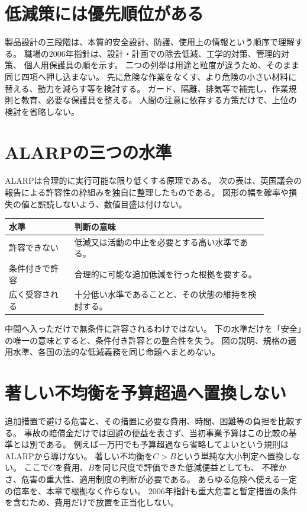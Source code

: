 \section{低減策には優先順位がある}
\label{theory:safety:hierarchy}
製品設計の三段階は、本質的安全設計、防護、使用上の情報という順序で理解する。
職場の2006年指針は、設計・計画での除去低減、工学的対策、管理的対策、
個人用保護具の順を示す\cite{saf_ra2006}。
二つの列挙は用途と粒度が違うため、そのまま同じ四項へ押し込まない。
先に危険な作業をなくす、より危険の小さい材料に替える、動力を減らす等を検討する。
ガード、隔離、排気等で補完し、作業規則と教育、必要な保護具を整える。
人間の注意に依存する方策だけで、上位の検討を省略しない。

\section{ALARPの三つの水準}
\label{theory:safety:alarp}
ALARPは合理的に実行可能な限り低くする原理である。
次の表は、英国議会の報告による許容性の枠組みを独自に整理したものである\cite{saf_parliament2006}。
図形の幅を確率や損失の値と誤読しないよう、数値目盛は付けない。
\begin{center}
\begin{tabular}{p{0.22\linewidth}p{0.65\linewidth}}
\hline
水準 & 判断の意味\\
\hline
許容できない & 低減又は活動の中止を必要とする高い水準である。\\
条件付きで許容 & 合理的に可能な追加低減を行った根拠を要する。\\
広く受容される & 十分低い水準であることと、その状態の維持を検討する。\\
\hline
\end{tabular}
\end{center}
中間へ入っただけで無条件に許容されるわけではない。
下の水準だけを「安全」の唯一の意味とすると、条件付き許容との整合性を失う。
図の説明、規格の適用水準、各国の法的な低減義務を同じ命題へまとめない。

\section{著しい不均衡を予算超過へ置換しない}
追加措置で避ける危害と、その措置に必要な費用、時間、困難等の負担を比較する。
事故の賠償金だけでは回避の便益を表さず、当初事業予算はこの比較の基準とは別である。
例えば一万円でも予算超過なら省略してよいという規則はALARPから導けない。
著しい不均衡を\(C>B\)という単純な大小判定へ置換しない。
ここで\(C\)を費用、\(B\)を同じ尺度で評価できた低減便益としても、
不確かさ、危害の重大性、適用制度の判断が必要である。
あらゆる危険へ使える一定の倍率を、本章で根拠なく作らない。
2006年指針も重大危害と暫定措置の条件を含むため、費用だけで放置を正当化しない。

